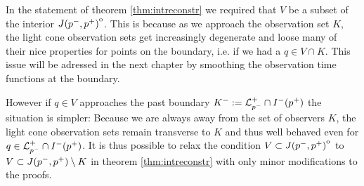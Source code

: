 \begin{remark}\label{rmk:ReconstrPastBoundary}
    In the statement of theorem \ref{thm:intreconstr} we required that $V$ be a subset of the interior ${\kern0ptJ(p^-,p^+)}^{\mathrm{o}}$. This is because as we approach the observation set $K$, the light cone observation sets get increasingly degenerate and loose many of their nice properties for points on the boundary, i.e. if we had a $q\in V\cap K$. This issue will be adressed in the next chapter by smoothing the observation time functions at the boundary.

    However if $q\in V$ approaches the past boundary $K^-:={\mathcal{L}}^+_{p^-}\cap I^-(p^+)$ the situation is simpler: Because we are always away from the set of observers $K$, the light cone observation sets remain transverse to $K$ and thus well behaved even for $q\in {\mathcal{L}}^+_{p^-}\cap I^-(p^+)$. It is thus possible to relax the condition $V\subset {\kern0ptJ(p^-,p^+)}^{\mathrm{o}}$ to $V\subset J(p^-,p^+) \setminus K$ in theorem \ref{thm:intreconstr} with only minor modifications to the proofs.
\end{remark}